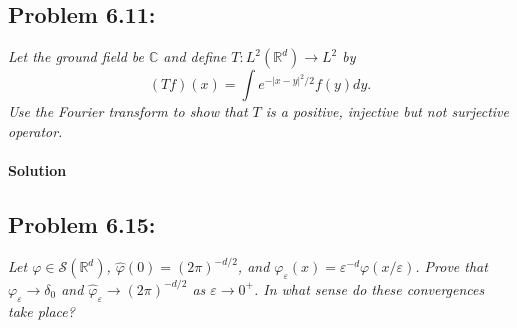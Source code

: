 \documentclass[letterpaper,twoside,11pt]{article}
\theoremstyle{mystyle}
\newcommand{\R}{{\mathbb R}}
\begin{document}
\newpage
\subsection*{Problem 6.11:}
\textit{Let the ground field be $\mathbb C$ and define $T: L^2\left( \R^d  \right) \to L^2$ by }
\[\left( Tf \right)(x) = \int e^{-|x-y|^2/2} f(y) dy.\]
\textit{Use the Fourier transform to show that $T$ is a positive, injective but not surjective operator. }
\paragraph*{Solution}

















\newpage 
\subsection*{Problem 6.15:}
\textit{Let $\varphi \in \mathcal S \left( \R^d \right)$, $\hat \varphi \left( 0 \right) = \left( 2\pi \right)^{-d/2}$, and $\varphi_\varepsilon \left( x \right) = \varepsilon^{-d} \varphi\left( x/\varepsilon \right)$. Prove that $\varphi_\varepsilon \to \delta_0$ and $\hat \varphi_\varepsilon \to \left( 2\pi  \right)^{-d/2}$ as $\varepsilon \to 0^+$. In what sense do these convergences take place? }
\end{document}
